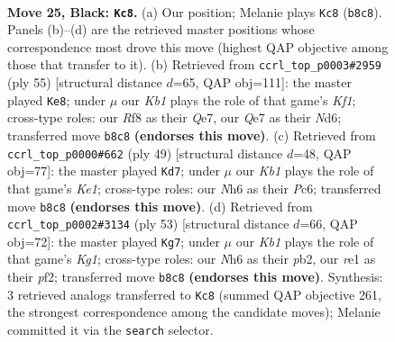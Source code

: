 \documentclass[11pt]{article}
\begin{document}
\clearpage

\begin{figure}[p]\centering
\begin{subfigure}{0.46\textwidth}\centering
\resizebox{\linewidth}{!}{%
\newchessgame
\chessboard[
  setfen={1k3r2/p1p1q1pp/1p2p2n/2p1Q3/5P2/2P5/1P4PP/2K1R3 b - - 0 25},
  showmover=false,
  pgfstyle=straightmove, color=movearrow, markmove={b8-c8}
]}
\caption{}
\end{subfigure}\hfill
\begin{subfigure}{0.46\textwidth}\centering
\resizebox{\linewidth}{!}{%
\newchessgame
\chessboard[
  setfen={5k2/1p2qpp1/pQpn3p/7P/8/4P1PB/PP3P2/6K1 b - - 0 28},
  showmover=false,
  pgfstyle=straightmove, color=movearrow, markmove={f8-e8}
]}
\caption{}
\end{subfigure}
\\[4pt]
\begin{subfigure}{0.46\textwidth}\centering
\resizebox{\linewidth}{!}{%
\newchessgame
\chessboard[
  setfen={2q1kr2/1p3p1p/p1p1p3/4Qp2/8/6P1/PPP2P1P/2K1R3 b - - 3 25},
  showmover=false,
  pgfstyle=straightmove, color=movearrow, markmove={e8-d7}
]}
\caption{}
\end{subfigure}\hfill
\begin{subfigure}{0.46\textwidth}\centering
\resizebox{\linewidth}{!}{%
\newchessgame
\chessboard[
  setfen={4r1k1/2p2p2/1p3qp1/p2Pp3/2P1Q3/6P1/PP3PK1/3R4 b - - 3 27},
  showmover=false,
  pgfstyle=straightmove, color=movearrow, markmove={g8-g7}
]}
\caption{}
\end{subfigure}
\caption{\textbf{Move 25, Black: \texttt{Kc8}.} (a) Our position; Melanie plays \texttt{Kc8} (\texttt{b8c8}). Panels (b)--(d) are the retrieved master positions whose correspondence most drove this move (highest QAP objective among those that transfer to it). (b) Retrieved from \texttt{ccrl\_top\_p0003\#2959} (ply 55) [structural distance $d$=65, QAP obj=111]: the master played \texttt{Ke8}; under $\mu$ our \emph{Kb1} plays the role of that game's \emph{Kf1}; cross-type roles: our \emph{R}f8 as their \emph{Q}e7, our \emph{Q}e7 as their \emph{N}d6; transferred move \texttt{b8c8} \textbf{(endorses this move)}. (c) Retrieved from \texttt{ccrl\_top\_p0000\#662} (ply 49) [structural distance $d$=48, QAP obj=77]: the master played \texttt{Kd7}; under $\mu$ our \emph{Kb1} plays the role of that game's \emph{Ke1}; cross-type roles: our \emph{N}h6 as their \emph{P}c6; transferred move \texttt{b8c8} \textbf{(endorses this move)}. (d) Retrieved from \texttt{ccrl\_top\_p0002\#3134} (ply 53) [structural distance $d$=66, QAP obj=72]: the master played \texttt{Kg7}; under $\mu$ our \emph{Kb1} plays the role of that game's \emph{Kg1}; cross-type roles: our \emph{N}h6 as their \emph{p}b2, our \emph{r}e1 as their \emph{p}f2; transferred move \texttt{b8c8} \textbf{(endorses this move)}. Synthesis: 3 retrieved analogs transferred to \texttt{Kc8} (summed QAP objective 261, the strongest correspondence among the candidate moves); Melanie committed it via the \texttt{search} selector.}
\label{fig:thought-m49}
\end{figure}
\end{document}
